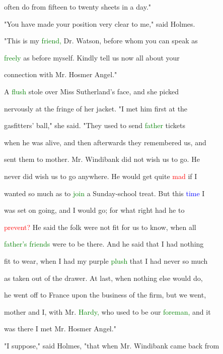  often do from fifteen to twenty sheets in a day."



 "You have made your position very clear to me," said Holmes.

 "This is my \textcolor{green}{friend,} Dr. Watson, before whom you can speak as

 \textcolor{green}{freely} as before myself. Kindly tell us now all about your

 connection with Mr. Hosmer \textcolor{BurntOrange}{Angel."}



 A \textcolor{green}{flush} stole over Miss Sutherland's face, and she picked

 nervously at the fringe of her jacket. "I met him first at the

 gasfitters' ball," she said. "They used to send \textcolor{green}{father} tickets

 when he was \textcolor{BurntOrange}{alive,} and then afterwards they remembered us, and

 sent them to \textcolor{BurntOrange}{mother.} Mr. Windibank did not wish us to go. He

 never did wish us to go anywhere. He would get quite \textcolor{red}{mad} if I

 wanted so much as to \textcolor{green}{join} a Sunday-school \textcolor{BurntOrange}{treat.} But this \textcolor{blue}{time} I

 was set on going, and I would go; for what right had he to

 \textcolor{red}{prevent?} He said the folk were not fit for us to know, when all

 \textcolor{green}{father's} \textcolor{green}{friends} were to be there. And he said that I had nothing

 fit to \textcolor{BurntOrange}{wear,} when I had my purple \textcolor{green}{plush} that I had never so much

 as taken out of the drawer. At last, when nothing else would do,

 he went off to France upon the business of the firm, but we went,

 \textcolor{BurntOrange}{mother} and I, with Mr. \textcolor{green}{Hardy,} who used to be our \textcolor{green}{foreman,} and it

 was there I met Mr. Hosmer \textcolor{BurntOrange}{Angel."}



 "I suppose," said Holmes, "that when Mr. Windibank came back from

